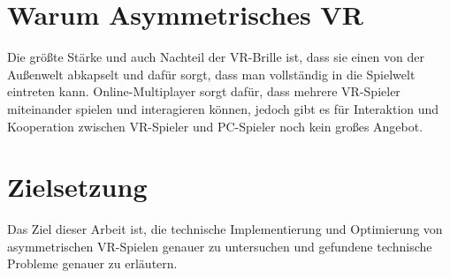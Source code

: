 \section{Warum Asymmetrisches VR}
Die größte Stärke und auch Nachteil der VR-Brille ist, dass sie einen von der Außenwelt abkapselt und dafür sorgt, dass man vollständig in die Spielwelt eintreten kann. Online-Multiplayer sorgt dafür, dass mehrere VR-Spieler miteinander spielen und interagieren können, jedoch gibt es für Interaktion und Kooperation zwischen VR-Spieler und PC-Spieler noch kein großes Angebot.

\section{Zielsetzung}
Das Ziel dieser Arbeit ist, die technische Implementierung und Optimierung von asymmetrischen VR-Spielen genauer zu untersuchen und gefundene technische Probleme genauer zu erläutern.

